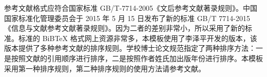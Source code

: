 

参考文献格式应符合国家标准 GB/T-7714-2005《文后参考文献著录规则》。中国国家标准化管理委员会于 2015 年 5 月 15 日发布了新的标准 GB/T 7714-2015《信息与文献参考文献著录规则》。因为二者的差别非常小，所以采用了新的标准。标准的 BiBTeX 格式网上资源非常多，本模板使用了李泽平开发的版本，该版本提供了多种参考文献的排序规则。学校博士论文规范指定了两种排序方法：一是按照文献的引用顺序进行排序，二是按照作者姓氏加出版年份进行排序。本模板采用第一种排序规则，第二种排序规则的使用方法请参考文献\cite{Lee2016}。


